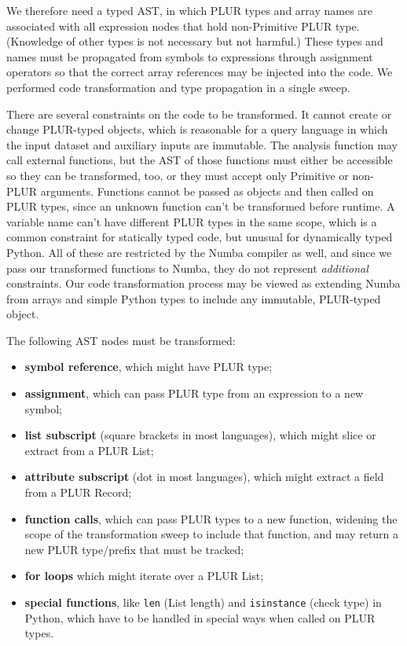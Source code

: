 \documentclass[10pt, conference, compsocconf]{IEEEtran}
\begin{document}
We therefore need a typed AST, in which PLUR types and array names are associated with all expression nodes that hold non-Primitive PLUR type. (Knowledge of other types is not necessary but not harmful.) These types and names must be propagated from symbols to expressions through assignment operators so that the correct array references may be injected into the code. We performed code transformation and type propagation in a single sweep.

There are several constraints on the code to be transformed. It cannot create or change PLUR-typed objects, which is reasonable for a query language in which the input dataset and auxiliary inputs are immutable. The analysis function may call external functions, but the AST of those functions must either be accessible so they can be transformed, too, or they must accept only Primitive or non-PLUR arguments. Functions cannot be passed as objects and then called on PLUR types, since an unknown function can't be transformed before runtime. A variable name can't have different PLUR types in the same scope, which is a common constraint for statically typed code, but unusual for dynamically typed Python. All of these are restricted by the Numba compiler as well, and since we pass our transformed functions to Numba, they do not represent {\it additional} constraints. Our code transformation process may be viewed as extending Numba from arrays and simple Python types to include any immutable, PLUR-typed object.

The following AST nodes must be transformed:
\begin{itemize}
\item {\bf symbol reference}, which might have PLUR type;
\item {\bf assignment}, which can pass PLUR type from an expression to a new symbol;
\item {\bf list subscript} (square brackets in most languages), which might slice or extract from a PLUR List;
\item {\bf attribute subscript} (dot in most languages), which might extract a field from a PLUR Record;
\item {\bf function calls}, which can pass PLUR types to a new function, widening the scope of the transformation sweep to include that function, and may return a new PLUR type/prefix that must be tracked;
\item {\bf for loops} which might iterate over a PLUR List;
\item {\bf special functions}, like {\tt len} (List length) and {\tt isinstance} (check type) in Python, which have to be handled in special ways when called on PLUR types.
\end{itemize}
\end{document}
